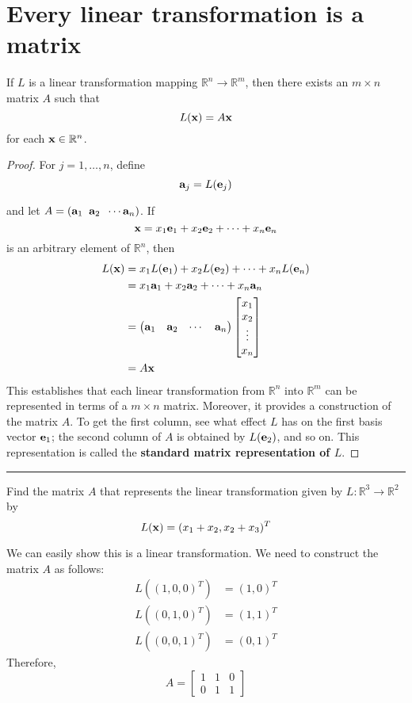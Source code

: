 \section{Every linear transformation is a matrix}
\begin{theorem}
	If $L$ is a linear transformation mapping  $\mathbb{R}^n \to \mathbb{R}^m$, then there exists an $m \times n$ matrix $A$ such that $$L({\bf x}) = A{\bf x}$$
	for each ${\bf x} \in \mathbb{R}^n$.  
	
	\begin{proof}
		For $j = 1, \dots, n$, define
		\[  {\bf a}_j = L({\bf e}_j)  \]
		
		and let $A = ({\bf a}_1 \;  \;  {\bf a}_2 \; \; \cdots {\bf a}_n )$.  If
		\[ {\bf x} = x_1 {\bf e}_1 + x_2 {\bf e}_2 + \cdots + x_n {\bf e}_n  \]
		is an arbitrary element of $\mathbb{R}^n$, then 
		\begin{align*}
			L({\bf x}) &= x_1 L({\bf e}_1) + x_2 L({\bf e}_2) + \cdots + x_n L({\bf e}_n)\\
			&= x_1 {\bf a}_1 + x_2 {\bf a}_2 + \cdots + x_n {\bf a}_n\\
			&=\begin{pmatrix} {\bf a}_1 &   {\bf a}_2 &  \cdots &  {\bf a}_n \end{pmatrix} \begin{bmatrix}x_1 \\ x_2 \\ \vdots \\ x_n \end{bmatrix}  \\
			& = A {\bf x}
		\end{align*}
		This establishes that each linear transformation from $\mathbb{R}^n$ into $\mathbb{R}^m$ can be represented in terms of a $m \times n$ matrix.  Moreover, it provides a construction of the matrix $A$.  To get the first column, see what effect $L$ has on the first basis vector ${\bf e}_1$;  the second column of $A$ is obtained by $L({\bf e}_2)$, and so on.  This representation is called the \textbf{standard matrix representation of $L$}.
	\end{proof}
\end{theorem}


\rule[0.01in]{\textwidth}{0.0025in}

\begin{example}
Find the matrix $A$ that represents the linear transformation given by $L: \mathbb{R}^3 \to \mathbb{R}^2$ by 
\[ L({\bf x}) = (x_1 + x_2, x_2+x_3)^T \]

We can easily show this is a linear transformation.  We need to construct the matrix $A$ as follows: 
\begin{align*}
	L((1,0,0)^T) &= (1,0)^T\\ 
	L((0,1,0)^T) &= (1,1)^T\\ 
	L((0,0,1)^T) &= (0,1)^T
\end{align*}
Therefore, 
\[  A = \begin{bmatrix} 1 & 1 & 0\\ 0 & 1 & 1\end{bmatrix}  \]
\end{example}


